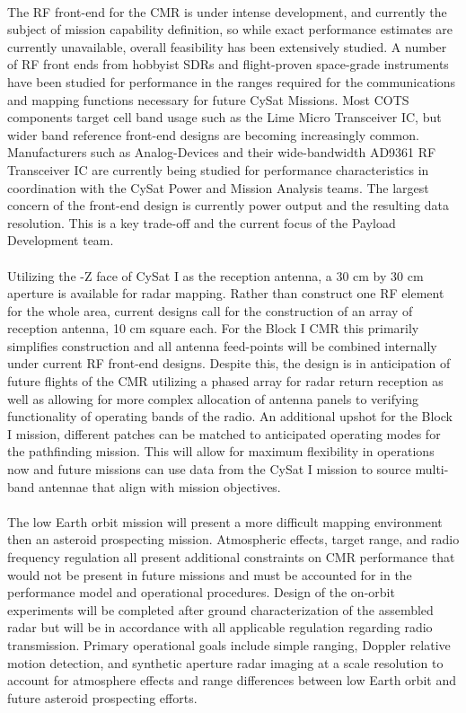 \documentclass[nocover]            %
{CSLI}                       %
\begin{document}
\\The RF front-end for the CMR is under intense development, and currently the subject of mission capability definition, so while exact performance estimates are currently unavailable, overall feasibility has been extensively studied. A number of RF front ends from hobbyist SDRs and flight-proven space-grade instruments have been studied for performance in the ranges required for the communications and mapping functions necessary for future CySat Missions. Most COTS components target cell band usage such as the Lime Micro Transceiver IC, but wider band reference front-end designs are becoming increasingly common. Manufacturers such as Analog-Devices and their wide-bandwidth AD9361 RF Transceiver IC are currently being studied for performance characteristics in coordination with the CySat Power and Mission Analysis teams. The largest concern of the front-end design is currently power output and the resulting data resolution. This is a key trade-off and the current focus of the Payload Development team.\\
\\Utilizing the -Z face of CySat I as the reception antenna, a 30 cm by 30 cm aperture is available for radar mapping. Rather than construct one RF element for the whole area, current designs call for the construction of an array of reception antenna, 10 cm square each. For the Block I CMR this primarily simplifies construction and all antenna feed-points will be combined internally under current RF front-end designs. Despite this, the design is in anticipation of future flights of the CMR utilizing a phased array for radar return reception as well as allowing for more complex allocation of antenna panels to verifying functionality of operating bands of the radio. An additional upshot for the Block I mission, different patches can be matched to anticipated operating modes for the pathfinding mission. This will allow for maximum flexibility in operations now and future missions can use data from the CySat I mission to source multi-band antennae that align with mission objectives.\\
\\The low Earth orbit mission will present a more difficult mapping environment then an asteroid prospecting mission. Atmospheric effects, target range, and radio frequency regulation all present additional constraints on CMR performance that would not be present in future missions and must be accounted for in the performance model and operational procedures. Design of the on-orbit experiments will be completed after ground characterization of the assembled radar but will be in accordance with all applicable regulation regarding radio transmission. Primary operational goals include simple ranging, Doppler relative motion detection, and synthetic aperture radar imaging at a scale resolution to account for atmosphere effects and range differences between low Earth orbit and future asteroid prospecting efforts.
\end{document}
